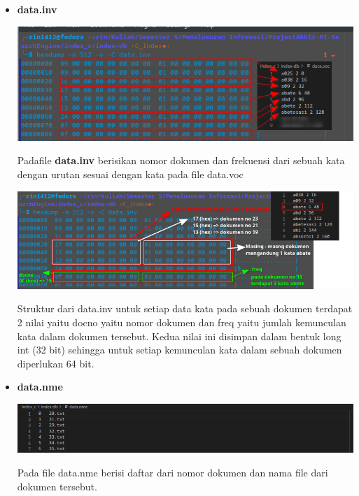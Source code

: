 \documentclass[12pt]{article}
\begin{document}
    \begin{itemize}
        \item \textbf{data.inv}
        \begin{flushleft}
            \includegraphics[scale=0.8]{images/index-1.png}
            
            \justifying
            Padafile \textbf{data.inv} berisikan nomor dokumen dan frekuensi dari sebuah kata dengan urutan sesuai dengan kata pada file data.voc

            \includegraphics[scale=0.7]{images/index-2.png}

            \justifying
            Struktur dari data.inv untuk setiap data kata pada sebuah dokumen terdapat 2 nilai yaitu docno yaitu nomor dokumen dan freq yaitu jumlah kemunculan kata dalam dokumen tersebut. Kedua nilai ini disimpan dalam bentuk long int (32 bit) sehingga untuk setiap kemunculan kata dalam sebuah dokumen diperlukan 64 bit.
        \end{flushleft}

        \item \textbf{data.nme}
        \begin{flushleft}
            \includegraphics[scale=0.75]{images/nme.png}

            \justifying
            Pada file data.nme berisi daftar dari nomor dokumen dan nama file dari dokumen tersebut.
        \end{flushleft}
        

\end{itemize}
\end{document}
